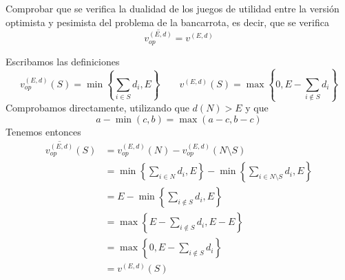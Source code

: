\documentclass[twoside]{article}
\begin{document}
\begin{ejercicio}{1} Comprobar que se verifica la dualidad de los juegos de utilidad entre la versión optimista y pesimista del problema de la bancarrota, es decir, que se verifica
$$
\overline{v_{op}^{(E,d)}} = v^{(E,d)}
$$ 
\end{ejercicio}
\begin{solucion}
Escribamos las definiciones
$$
v_{op}^{(E,d)}(S) = \min\left\{\sum_{i\in S} d_i,E\right\}
\qquad
v^{(E,d)}(S) =\max\left\{0,E-\sum_{i\notin S} d_i\right\}
$$
Comprobamos directamente, utilizando que $d(N)>E$ y que $$a-\min(c,b) = \max(a-c,b-c)$$
Tenemos entonces
\begin{align*}
\overline{v_{op}^{(E,d)}}(S) &= v_{op}^{(E,d)}(N)-v_{op}^{(E,d)}(N\setminus S)\\
&= \min\left\{\sum_{i\in N} d_i,E\right\} -  \min\left\{\sum_{i\in N\setminus S} d_i,E\right\}\\
&= E -  \min\left\{\sum_{i\notin S} d_i,E\right\}\\
&= \max\left\{E-\sum_{i\notin S} d_i, E-E\right\}\\
&= \max\left\{0,E-\sum_{i\notin S} d_i\right\}\\
&= v^{(E,d)}(S)
\end{align*}

\end{solucion}

\newpage
\end{document}
